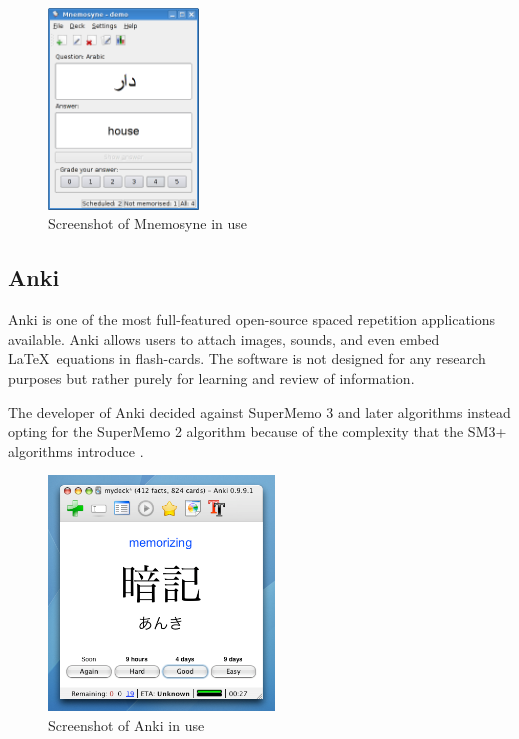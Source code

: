 \begin{figure}[h!]
\includegraphics[width=4cm]{img/mnemosyne_screen.png}
\caption{Screenshot of Mnemosyne in use}
\end{figure}

\subsection*{Anki}
Anki is one of the most full-featured open-source spaced repetition applications available.
Anki allows users to attach images, sounds, and even embed \LaTeX \ equations in flash-cards. The
software is not designed for any research purposes but rather purely for learning and
review of information.

The developer of Anki decided against SuperMemo 3 and later algorithms instead opting for
the SuperMemo 2 algorithm because of the complexity that the SM3+ algorithms introduce \cite{anki_faq}.

\begin{figure}[h!]
\includegraphics[width=6cm]{img/anki.png}
\caption{Screenshot of Anki in use}
\end{figure}